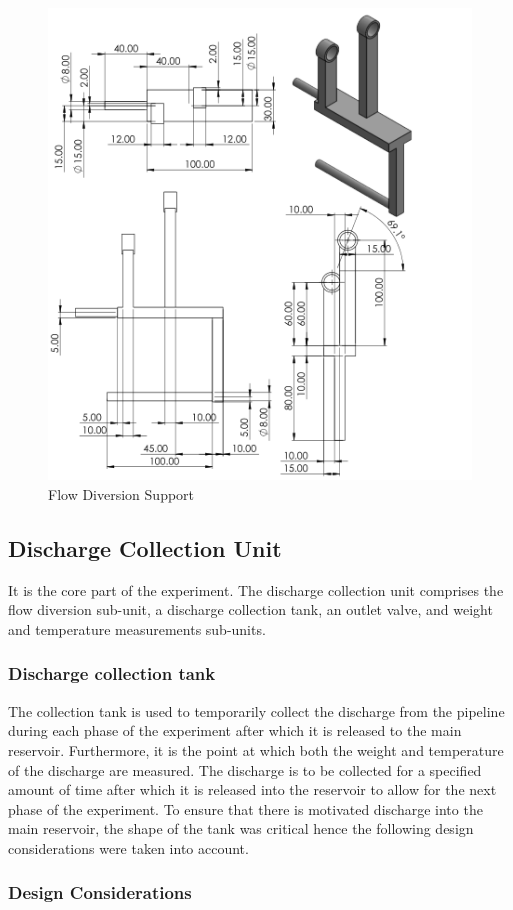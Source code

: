 \begin{figure}[H]
\includegraphics[width=0.7\linewidth]{Figures/ssholder.png}
\centering
\caption{Flow Diversion Support }
\label{fig:ssholder}
\end{figure}

\subsection{Discharge Collection Unit}
It is the core part of the experiment. The discharge collection unit comprises the flow diversion sub-unit, a discharge collection tank, an outlet valve, and weight and temperature measurements sub-units.
\subsubsection{Discharge collection tank}
The collection tank is used to temporarily collect the discharge from the pipeline during each phase of the experiment after which it is released to the main reservoir. Furthermore, it is the point at which both the weight and temperature of the discharge are measured. The discharge is to be collected for a specified amount of time after which it is released into the reservoir to allow for the next phase of the experiment. To ensure that there is motivated discharge into the main reservoir, the shape of the tank was critical hence the following design considerations were taken into account.
\subsubsection{Design Considerations}

